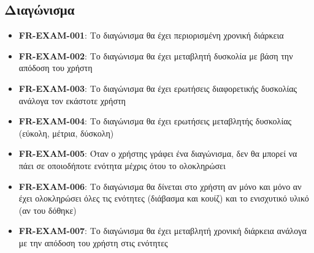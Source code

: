\subsection{Διαγώνισμα}
\begin{itemize}
    \item \textbf{\textlatin{FR-EXAM-001}}: Το διαγώνισμα θα έχει περιορισμένη χρονική διάρκεια
    \item \textbf{\textlatin{FR-EXAM-002}}: Το διαγώνισμα θα έχει μεταβλητή δυσκολία με βάση την απόδοση του χρήστη
    \item \textbf{\textlatin{FR-EXAM-003}}: Το διαγώνισμα θα έχει ερωτήσεις διαφορετικής δυσκολίας ανάλογα τον εκάστοτε χρήστη
    \item \textbf{\textlatin{FR-EXAM-004}}: Το διαγώνισμα θα έχει ερωτήσεις μεταβλητής δυσκολίας (εύκολη, μέτρια, δύσκολη)
    \item \textbf{\textlatin{FR-EXAM-005}}: Όταν ο χρήστης γράφει ένα διαγώνισμα, δεν θα μπορεί να πάει σε οποιοδήποτε ενότητα μέχρις ότου το ολοκληρώσει
    \item \textbf{\textlatin{FR-EXAM-006}}: Το διαγώνισμα θα δίνεται στο χρήστη αν μόνο και μόνο αν έχει ολοκληρώσει όλες τις ενότητες (διάβασμα και κουίζ) και το ενισχυτικό υλικό (αν του δόθηκε)
    \item \textbf{\textlatin{FR-EXAM-007}}: Το διαγώνισμα θα έχει μεταβλητή χρονική διάρκεια ανάλογα με την απόδοση του χρήστη στις ενότητες
\end{itemize}